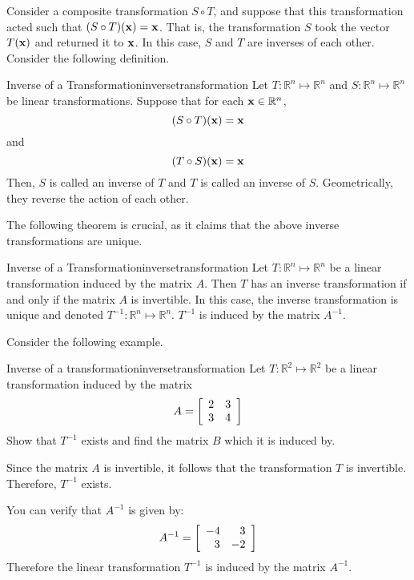 Consider a composite transformation $S \circ T$, and suppose that this transformation acted such that $(S \circ T) ({\bf x}) = {\bf x}$. That is, the transformation $S$ took the vector $T({\bf x})$ and returned it to ${\bf x}$. In this case, $S$ and $T$ are inverses of each other. Consider the following definition.  

\begin{definition}{Inverse of a Transformation}{inversetransformation}
Let $T: \mathbb{R}^n \mapsto \mathbb{R}^n$ and $S:\mathbb{R}^n \mapsto \mathbb{R}^n$ be linear transformations. Suppose that for each ${\bf x} \in \mathbb{R}^n$, 
\[
(S \circ T)({\bf x}) = {\bf x}
\]
and 
\[
(T \circ S)({\bf x}) = {\bf x}
\]
Then, $S$ is called an inverse of $T$  and $T$ is called an inverse of $S$. Geometrically, they reverse the action of each other. 
\end{definition}

The following theorem is crucial, as it claims that the above inverse transformations are unique. 

\begin{theorem}{Inverse of a Transformation}{inversetransformation}
Let $T:\mathbb{R}^n \mapsto \mathbb{R}^n$ be a linear transformation induced by the matrix $A$. Then $T$ has an inverse transformation if and only if the matrix $A$ is invertible. In this case, the inverse transformation is unique and denoted $T^{-1}: \mathbb{R}^n \mapsto \mathbb{R}^n$. $T^{-1}$ is induced by the matrix $A^{-1}$. 
\end{theorem}

Consider the following example. 

\begin{example}{Inverse of a transformation}{inversetransformation}
Let $T: \mathbb{R}^2 \mapsto \mathbb{R}^2$ be a linear transformation induced by the matrix 
\[
A = 
\left[
\begin{array}{rr}
2 & 3 \\
3 & 4
\end{array}
\right]
\]
Show that $T^{-1}$ exists and find the matrix $B$ which it is induced by. 
\end{example}

\begin{solution}
Since the matrix $A$ is invertible, it follows that the transformation $T$ is invertible. Therefore, $T^{-1}$ exists. 

You can verify that $A^{-1}$ is given by:
\[
A^{-1}
=
\left[
\begin{array}{rr}
-4 & 3 \\
3 & -2
\end{array}
\right]
\]
Therefore the linear transformation $T^{-1}$ is induced by the matrix $A^{-1}$. 
\end{solution}

